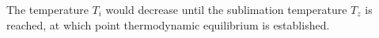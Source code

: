 The temperature \( T_i \) would decrease until the sublimation temperature \( T_z \) is reached, at which point thermodynamic equilibrium is established.